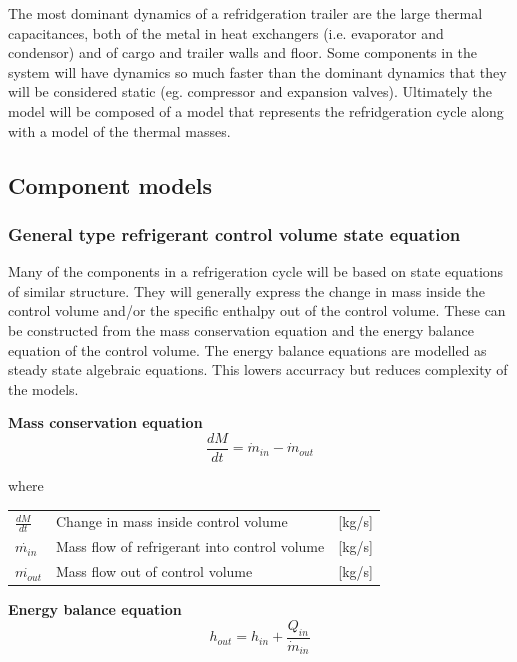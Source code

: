 The most dominant dynamics of a refridgeration trailer are the large thermal capacitances, both of the metal in heat exchangers (i.e. evaporator and condensor) and of cargo and trailer walls and floor. Some components in the system will have dynamics so much faster than the dominant dynamics that they will be considered static (eg. compressor and expansion valves).
Ultimately the model will be composed of a model that represents the refridgeration cycle along with a model of the thermal masses.


\subsection{Component models}

\subsubsection{General type refrigerant control volume state equation}
Many of the components in a refrigeration cycle will be based on state equations of similar structure. They will generally express the change in mass inside the control volume and/or the specific enthalpy out of the control volume. These can be constructed from the mass conservation equation and the energy balance equation of the control volume. The energy balance equations are modelled as steady state algebraic equations. This lowers accurracy but reduces complexity of the models.

\textbf{Mass conservation equation} \\
\begin{equation} \label{eq:GeneralTypeControlVol_MassConservation}
	\frac{dM}{dt} = \dot{m}_{in} - \dot{m}_{out}
\end{equation}

where
\begin{center}
	\begin{tabular}{l p{8cm} l}
		$\frac{dM}{dt}$ 	& Change in mass inside control volume & [\si{kg}/\si{s}]\\
		$\dot{m_{in}}$ 		& Mass flow of refrigerant into control volume & [\si{kg}/\si{s}]\\
		$\dot{m_{out}}$ 	& Mass flow out of control volume & [\si{kg}/\si{s}]\\
	\end{tabular}
\end{center}

\textbf{Energy balance equation}
\begin{equation}
	h_{out} = h_{in} + \frac{Q_{in}}{\dot{m}_{in}}
\end{equation}


